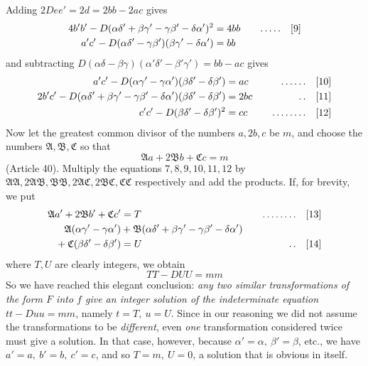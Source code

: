 Adding $2Dee'=2d=2bb-2ac$ gives
\[
\begin{aligned}
4b'b'-D(\alpha\delta'+\beta\gamma'-\gamma\beta'-\delta\alpha')^2&=4bb&\quad\mathinner{.\,.\,.\,.\,.}\quad&[9]\\
a'c'-D(\alpha\delta'-\gamma\beta')(\beta\gamma'-\delta\alpha')&=bb
\end{aligned}
\]
and subtracting $D(\alpha\delta-\beta\gamma)(\alpha'\delta'-\beta'\gamma')=bb-ac$ gives
\[
\begin{aligned}
a'c'-D(\alpha\gamma'-\gamma\alpha')(\beta\delta'-\delta\beta')&=ac&\quad\mathinner{.\,.\,.\,.\,.\,.}\quad&[10]\\
2b'c'-D(\alpha\delta'+\beta\gamma'-\gamma\beta'-\delta\alpha')(\beta\delta'-\delta\beta')&=2bc&\quad\mathinner{.\,.}\quad&[11]\\
c'c'-D(\beta\delta'-\delta\beta')^2&=cc&\quad\mathinner{.\,.\,.\,.\,.\,.\,.\,.}\quad&[12]
\end{aligned}
\]
Now let the greatest common divisor of the numbers $a,2b,c$ be $m$, and choose the numbers $\mathfrak{A},\mathfrak{B},\mathfrak{C}$ so that
\[
\mathfrak{A}a+2\mathfrak{B}b+\mathfrak{C}c=m
\]
(Article 40). Multiply the equations $7,8,9,10,11,12$ by $\mathfrak{A}\mathfrak{A},\allowbreak 2\mathfrak{A}\mathfrak{B},\allowbreak \mathfrak{B}\mathfrak{B},\allowbreak 2\mathfrak{A}\mathfrak{C},\allowbreak 2\mathfrak{B}\mathfrak{C},\allowbreak \mathfrak{C}\mathfrak{C}$ respectively and add the products. If, for brevity, we put
\[
\begin{aligned}
\mathfrak{A}a'+2\mathfrak{B}b'+\mathfrak{C}c'&=T&\quad\mathinner{.\,.\,.\,.\,.\,.\,.\,.}\quad&[13]\\
\mathfrak{A}(\alpha\gamma'-\gamma\alpha')&+\mathfrak{B}(\alpha\delta'+\beta\gamma'-\gamma\beta'-\delta\alpha')&&\\
{}+\mathfrak{C}(\beta\delta'-\delta\beta')&=U&\quad\mathinner{.\,.}\quad&[14]
\end{aligned}
\]
where $T,U$ are clearly integers, we obtain
\[
TT-DUU=mm
\]
So we have reached this elegant conclusion: \textit{any two similar transformations of the form $F$ into $f$ give an integer solution of the indeterminate equation $tt-Duu=mm$}, namely $t=T,\ u=U$. Since in
our reasoning we did not assume the transformations to be \textit{different}, even \textit{one} transformation considered twice must give a solution. In that case, however, because $\alpha'=\alpha,\ \beta'=\beta$, etc., we have $a'=a,\ b'=b,\ c'=c$, and so $T=m,\ U=0$, a solution that is obvious in itself.

